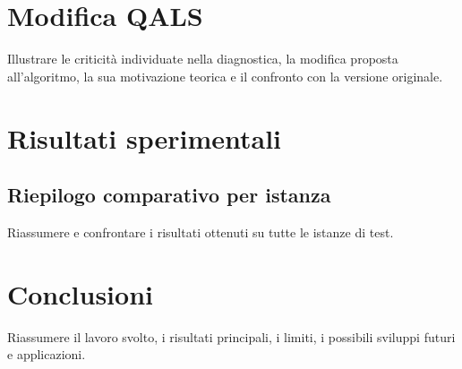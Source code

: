\documentclass[12pt,a4paper,oneside]{report}
\begin{document}
\chapter{Modifica QALS}
Illustrare le criticità individuate nella diagnostica, la modifica proposta 
all'algoritmo, la sua motivazione teorica e il confronto con la versione originale.
 
\chapter{Risultati sperimentali}
 
\section{Riepilogo comparativo per istanza}
Riassumere e confrontare i risultati ottenuti su tutte le istanze di test.
 
\chapter{Conclusioni}
Riassumere il lavoro svolto, i risultati principali, i limiti, i possibili 
sviluppi futuri e applicazioni.
 
 
\end{document}
